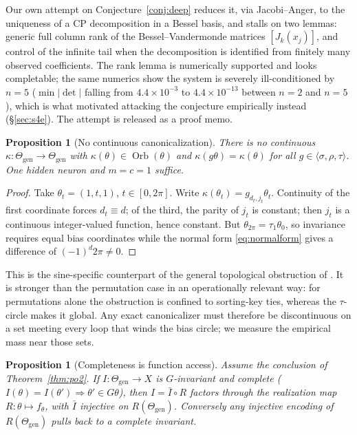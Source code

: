 \documentclass[10pt,letterpaper]{article}
\newtheorem{proposition}[theorem]{Proposition}
\theoremstyle{definition}
\newcommand{\Thgen}{\Theta_{\mathrm{gen}}}
\DeclareMathOperator{\Orb}{Orb}
\begin{document}
Our own attempt on Conjecture~\ref{conj:deep} reduces it, via Jacobi--Anger, to the uniqueness of a
CP decomposition in a Bessel basis, and stalls on two lemmas: generic full column rank of the
Bessel--Vandermonde matrices $[J_k(x_j)]$, and control of the infinite tail when the decomposition
is identified from finitely many observed coefficients. The rank lemma is numerically supported and
looks completable; the same numerics show the system is severely ill-conditioned by $n=5$
($\min|\det|$ falling from $4.4\times10^{-3}$ to $4.4\times10^{-13}$ between $n=2$ and $n=5$), which
is what motivated attacking the conjecture empirically instead (\S\ref{sec:s4e}). The attempt is released as a proof memo.

\begin{proposition}[No continuous canonicalization]\label{prop:po5}
There is no continuous $\kappa : \Thgen \to \Thgen$ with $\kappa(\theta) \in \Orb(\theta)$ and
$\kappa(g\theta) = \kappa(\theta)$ for all $g \in \langle\sigma,\rho,\tau\rangle$. One hidden
neuron and $m=c=1$ suffice.
\end{proposition}

\begin{proof}
Take $\theta_t = (1,t,1)$, $t\in[0,2\pi]$. Write $\kappa(\theta_t) = g_{d_t,j_t}\theta_t$.
Continuity of the first coordinate forces $d_t \equiv d$; of the third, the parity of $j_t$ is
constant; then $j_t$ is a continuous integer-valued function, hence constant. But
$\theta_{2\pi} = \tau_1\theta_0$, so invariance requires equal bias coordinates while the normal
form \eqref{eq:normalform} gives a difference of $(-1)^d 2\pi \neq 0$.
\end{proof}

This is the sine-specific counterpart of the general topological obstruction of
\citet{dym2024impossibility}. It is stronger than the permutation case in an operationally
relevant way: for permutations alone the obstruction is confined to sorting-key ties, whereas the
$\tau$-circle makes it global. Any exact canonicalizer must therefore be discontinuous on a set
meeting every loop that winds the bias circle; we measure the empirical mass near those sets.

\begin{proposition}[Completeness is function access]\label{prop:po6}
Assume the conclusion of Theorem~\ref{thm:po2}. If $I : \Thgen \to X$ is $G$-invariant and
\emph{complete} ($I(\theta)=I(\theta') \Rightarrow \theta' \in G\theta$), then $I = \bar I \circ R$
factors through the realization map $R:\theta \mapsto f_\theta$, with $\bar I$ injective on
$R(\Thgen)$. Conversely any injective encoding of $R(\Thgen)$ pulls back to a complete invariant.
\end{proposition}
\end{document}
